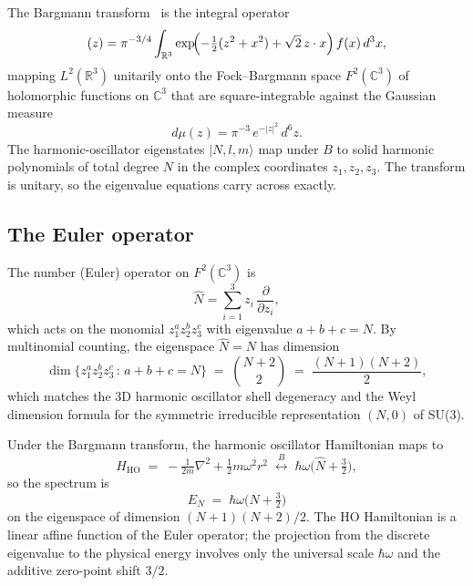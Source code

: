 \documentclass[twocolumn,pra,amsmath,amssymb,superscriptaddress]{revtex4-2}
\begin{document}
The Bargmann transform~\cite{bargmann1961} is the integral operator
\begin{equation}
  [B f](z) =
  \pi^{-3/4}
  \int_{\mathbb{R}^3}
  \exp\!\Bigl(
    -\tfrac{1}{2}(z^2 + x^2) + \sqrt{2}\, z \cdot x
  \Bigr)\, f(x)\, d^3 x,
  \label{eq:bargmann-kernel}
\end{equation}
mapping $L^2(\mathbb{R}^3)$ unitarily onto the
Fock--Bargmann space $F^2(\mathbb{C}^3)$ of holomorphic functions on
$\mathbb{C}^3$ that are square-integrable against the Gaussian
measure
\begin{equation}
  d\mu(z) = \pi^{-3}\, e^{-|z|^2}\, d^6 z.
  \label{eq:bargmann-measure}
\end{equation}
The harmonic-oscillator eigenstates $|N, l, m\rangle$ map under $B$
to solid harmonic polynomials of total degree $N$ in the complex
coordinates $z_1, z_2, z_3$.  The transform is unitary, so the
eigenvalue equations carry across exactly.

\subsection{The Euler operator}
\label{sec:euler}

The number (Euler) operator on $F^2(\mathbb{C}^3)$ is
\begin{equation}
  \hat{N} = \sum_{i = 1}^{3} z_i\, \frac{\partial}{\partial z_i},
  \label{eq:euler}
\end{equation}
which acts on the monomial $z_1^a z_2^b z_3^c$ with eigenvalue
$a + b + c = N$.  By multinomial counting, the eigenspace
$\hat{N} = N$ has dimension
\begin{equation}
  \dim\bigl\{ z_1^a z_2^b z_3^c \,:\, a + b + c = N \bigr\}
  \;=\;
  \binom{N + 2}{2}
  \;=\;
  \frac{(N+1)(N+2)}{2},
  \label{eq:dim}
\end{equation}
which matches the 3D harmonic oscillator shell degeneracy and the
Weyl dimension formula for the symmetric irreducible representation
$(N, 0)$ of SU(3).

Under the Bargmann transform, the harmonic oscillator Hamiltonian
maps to
\begin{equation}
  H_{\mathrm{HO}}
  \;=\;
  -\tfrac{1}{2 m}\nabla^2 + \tfrac{1}{2} m \omega^2 r^2
  \;\stackrel{B}{\longleftrightarrow}\;
  \hbar \omega \bigl(\hat{N} + \tfrac{3}{2}\bigr),
  \label{eq:H-bargmann}
\end{equation}
so the spectrum is
\begin{equation}
  E_N \;=\; \hbar\omega\bigl(N + \tfrac{3}{2}\bigr)
  \label{eq:HO-spectrum}
\end{equation}
on the eigenspace of dimension $(N+1)(N+2)/2$.  The HO Hamiltonian
is a linear affine function of the Euler operator; the projection
from the discrete eigenvalue to the physical energy involves only
the universal scale $\hbar\omega$ and the additive zero-point
shift $3/2$.
\end{document}
